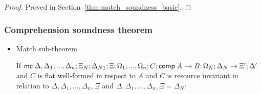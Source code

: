 \begin{proof}
Proved in Section~\ref{thm:match_soundness_basic}.
\end{proof}

\subsubsection{Comprehension soundness theorem}

\begin{itemize}
   \item Match sub-theorem

If $\mathsf{mc} \; \Delta, \Delta_1, ..., \Delta_n; \Xi_N; \Delta_{N1}; \Xi; \Omega_1, ..., \Omega_n; C; \mathsf{comp} \; A \multimap B; \Omega_N; \Delta_N \rightarrow \Xi'; \Delta'$  and $C$ is flat well-formed in respect to $A$ and $C$ is resource invariant in relation to $\Delta, \Delta_1, ..., \Delta_n, \Xi$ and $\Delta, \Delta_1, ..., \Delta_n, \Xi = \Delta_N$:\\


\end{itemize}
